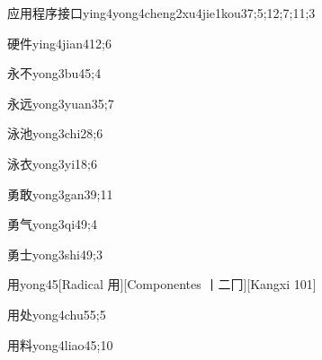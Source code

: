 \begin{verbete}{应用程序接口}{ying4yong4cheng2xu4jie1kou3}{7;5;12;7;11;3}
\end{verbete}

\begin{verbete}{硬件}{ying4jian4}{12;6}
\end{verbete}

\begin{verbete}{永不}{yong3bu4}{5;4}
\end{verbete}

\begin{verbete}{永远}{yong3yuan3}{5;7}
\end{verbete}

\begin{verbete}{泳池}{yong3chi2}{8;6}
\end{verbete}

\begin{verbete}{泳衣}{yong3yi1}{8;6}
\end{verbete}

\begin{verbete}{勇敢}{yong3gan3}{9;11}
\end{verbete}

\begin{verbete}{勇气}{yong3qi4}{9;4}
\end{verbete}

\begin{verbete}{勇士}{yong3shi4}{9;3}
\end{verbete}

\begin{verbete}{用}{yong4}{5}[Radical 用][Componentes 丨二冂][Kangxi 101]
\end{verbete}

\begin{verbete}{用处}{yong4chu5}{5;5}
\end{verbete}

\begin{verbete}{用料}{yong4liao4}{5;10}
\end{verbete}

